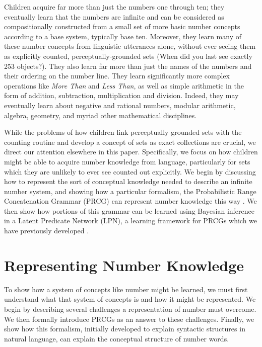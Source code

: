 \documentclass[10pt,letterpaper]{article}
\begin{document}
Children acquire far more than just the numbers one through ten; they
eventually learn that the numbers are infinite and can be considered
as compositionally constructed from a small set of more basic number
concepts according to a base system, typically base ten. Moreover,
they learn many of these number concepts from linguistic utterances
alone, without ever seeing them as explicitly counted,
perceptually-grounded sets (When did you last see exactly 253
objects?). They also learn far more than just the names of the numbers
and their ordering on the number line. They learn significantly more
complex operations like \emph{More Than} and \emph{Less Than}, as well
as simple arithmetic in the form of addition, subtraction,
multiplication and division. Indeed, they may eventually learn about
negative and rational numbers, modular arithmetic, algebra, geometry,
and myriad other mathematical disciplines.

While the problems of how children link perceptually grounded sets
with the counting routine and develop a concept of sets as exact
collections are crucial, we direct our attention elsewhere in this
paper. Specifically, we focus on how children might be able to acquire
number knowledge from language, particularly for sets which they are
unlikely to ever see counted out explicitly. We begin by discussing
how to represent the sort of conceptual knowledge needed to describe
an infinite number system, and showing how a particular formalism, the
Probabilistic Range Concatenation Grammar (PRCG) can represent number
knowledge this way \citep{boullier2005range}. We then show how
portions of this grammar can be learned using Bayesian inference in a
Latent Predicate Network (LPN), a learning framework for PRCGs which
we have previously developed \citep{DecRulTenming}.

\section{Representing Number Knowledge}

To show how a system of concepts like number might be learned, we must
first understand what that system of concepts is and how it might be
represented. We begin by describing several challenges a
representation of number must overcome. We then formally introduce
PRCGs as an answer to these challenges. Finally, we show how this
formalism, initially developed to explain syntactic structures in
natural language, can explain the conceptual structure of number
words.
\end{document}

